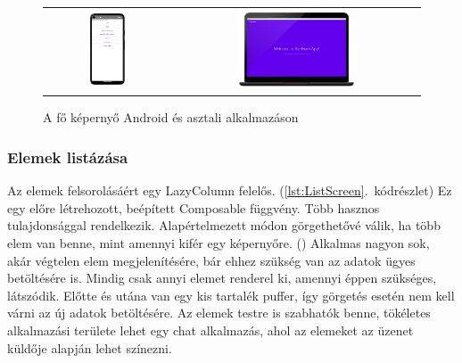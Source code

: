 \begin{figure}[!ht]
    \centering
    \begin{tabular}{cc}
        \includegraphics[width=0.3\textwidth, keepaspectratio]{figures/MainScreen_Android.png} & 
        \includegraphics[width=0.5\textwidth, keepaspectratio]{figures/MainScreen_Desktop1_framed.png}
    \end{tabular}
    \caption{A fő képernyő Android és asztali alkalmazáson}
    \label{fig:MainScreen}
\end{figure}


\pagebreak

\subsubsection{Elemek listázása}

Az elemek felsorolásáért egy LazyColumn felelős. (\ref{lst:ListScreen}.~kódrészlet)
Ez egy előre létrehozott, beépített Composable függvény.
Több hasznos tulajdonsággal rendelkezik. Alapértelmezett módon görgethetővé válik, ha több elem van benne, mint amennyi kifér egy képernyőre. ()
Alkalmas nagyon sok, akár végtelen elem megjelenítésére, bár ehhez szükség van az adatok ügyes betöltésére is. 
Mindig csak annyi elemet renderel ki, amennyi éppen szükséges, látszódik. Előtte és utána van egy kis tartalék puffer, így görgetés esetén nem kell várni az új adatok betöltésére.
Az elemek testre is szabhatók benne, tökéletes alkalmazási területe lehet egy chat alkalmazás, ahol az elemeket az üzenet küldője alapján lehet színezni.

